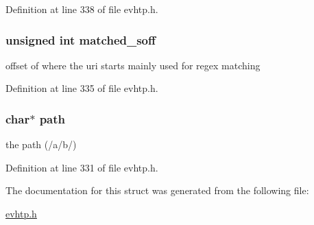 Definition at line 338 of file evhtp.h.

\hypertarget{structevhtp__path__s_af11f4fc41ab5561c5d430cedfa5e53d8}{
\subsubsection[{matched\_\-soff}]{\setlength{\rightskip}{0pt plus 5cm}unsigned int {\bf matched\_\-soff}}}
\label{structevhtp__path__s_af11f4fc41ab5561c5d430cedfa5e53d8}
offset of where the uri starts mainly used for regex matching 

Definition at line 335 of file evhtp.h.

\hypertarget{structevhtp__path__s_a44196e6a5696d10442c29e639437196e}{
\subsubsection[{path}]{\setlength{\rightskip}{0pt plus 5cm}char$\ast$ {\bf path}}}
\label{structevhtp__path__s_a44196e6a5696d10442c29e639437196e}
the path (/a/b/) 

Definition at line 331 of file evhtp.h.



The documentation for this struct was generated from the following file:\begin{DoxyCompactItemize}
\item 
\hyperlink{evhtp_8h}{evhtp.h}\end{DoxyCompactItemize}
